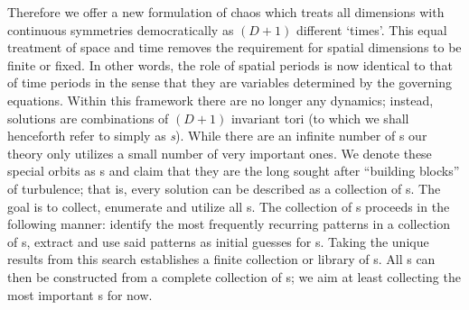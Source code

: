 Therefore we offer a new {\spt} formulation of chaos which
treats all dimensions with continuous symmetries democratically as $(D+1)$ different `times'.
This equal treatment of space and time removes the requirement for
spatial dimensions to be finite or fixed. In other words,
the role of spatial periods is now identical to that of time periods
in the sense that they are
variables determined by the governing equations.
Within this framework there
are no longer any dynamics; instead, solutions are {\spt} combinations of
$(D+1)$ invariant tori (to which we shall henceforth refer to simply as \emph{{\po}s}).
While there are an infinite number of {\po}s our theory only utilizes a small
number of very important ones. We denote these special orbits as {\fpo}s and claim
that they are the long sought after ``building blocks''
of turbulence; that is, every solution can be described as a collection of {\fpo}s.
The goal is to collect, enumerate and utilize all {\fpo}s.
The collection of {\fpo}s proceeds in the following manner:
identify the most frequently recurring patterns in a collection of {\po}s,
extract and use said patterns as initial guesses for {\fpo}s. Taking the
unique results from this search establishes a finite collection or library
of {\fpo}s.
All {\po}s can then be constructed from a complete collection of {\fpo}s; we
aim at least collecting the most important {\fpo}s for now.

